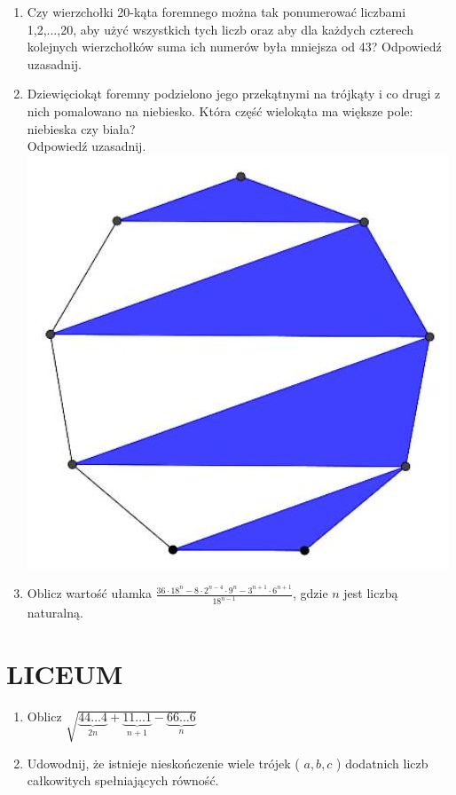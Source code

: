\documentclass[10pt]{article}
\begin{document}
\begin{enumerate}
  \item Czy wierzchołki 20-kąta foremnego można tak ponumerować liczbami 1,2,...,20, aby użyć wszystkich tych liczb oraz aby dla każdych czterech kolejnych wierzchołków suma ich numerów była mniejsza od 43? Odpowiedź uzasadnij.
  \item Dziewięciokąt foremny podzielono jego przekątnymi na trójkąty i co drugi z nich pomalowano na niebiesko. Która część wielokąta ma większe pole: niebieska czy biała?\\
Odpowiedź uzasadnij.\\
\includegraphics[max width=\textwidth, center]{2024_11_21_e3816fc2ecd6c27612f5g-1(1)}
  \item Oblicz wartość ułamka \(\frac{36 \cdot 18^{n}-8 \cdot 2^{n-4} \cdot 9^{n}-3^{n+1} \cdot 6^{n+1}}{18^{n-1}}\), gdzie \(n\) jest liczbą naturalną.
\end{enumerate}

\section*{LICEUM}
\begin{enumerate}
  \item Oblicz \(\sqrt{\underbrace{44 \ldots 4}_{2 n}+\underbrace{11 \ldots 1}_{n+1}-\underbrace{66 \ldots 6}_{n}}\)
  \item Udowodnij, że istnieje nieskończenie wiele trójek ( \(a, b, c\) ) dodatnich liczb całkowitych spełniających równość.
\end{enumerate}
\end{document}
